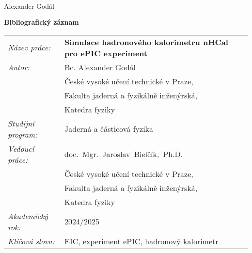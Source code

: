 \documentclass[a4paper, 12pt, oneside]{book}
\newcommand{\cvut}{České vysoké učení technické v Praze}
\newcommand{\fjfi}{Fakulta jaderná a fyzikálně inženýrská}
\newcommand{\kf}{Katedra fyziky}
\newcommand{\obor}{Jaderná a částicová fyzika}
\newcommand{\nazevcz}{Simulace hadronového kalorimetru nHCal pro ePIC experiment}
\newcommand{\klicovaslovacz}{EIC, experiment ePIC, hadronový kalorimetr}
\newcommand{\autor}{Bc. Alexander Godál}
\newcommand{\vedouci}{doc.~Mgr.~Jaroslav~Bielčík,~Ph.D.}
\newcommand{\konzultant}{Ing.~Alexandr~Prozorov,~Ph.D.}
\newcommand{\akrok}{2024/2025}
\begin{document}




%
%

%


\newpage
\thispagestyle{empty}


\vfill 
{}
\bigskip
\\
\indent %
\begin{flushright}
Alexander Godál
\end{flushright} 


\newpage
\thispagestyle{empty}

{\bf Bibliografický záznam}

\vspace{5mm} 

\begin{tabular}{p{100pt}l}
  {\em Název práce:} & {\bf \footnotesize\nazevcz} \\
  {\em Autor:} & \autor \\
   &\cvut, \\   
   &\fjfi,\\
   &\kf\\ 
  {\em Studijní program:} & \obor\\ 
  {\em Vedoucí práce:} & \vedouci \\ 
   &\cvut, \\   
   &\fjfi,\\
   &\kf\\
  {\em Akademický rok:} & \akrok\\
  {\em Klíčová slova:} & \klicovaslovacz\\
\end{tabular}
\end{document}
